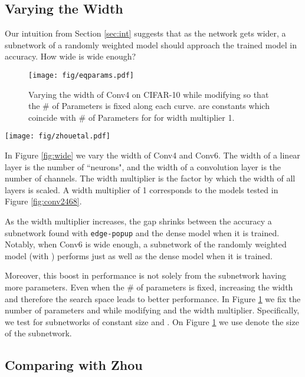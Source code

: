 \documentclass[10pt,twocolumn,letterpaper]{article}
\newcommand{\alg}{\texttt{edge-popup} }
\begin{document}
\subsection{Varying the Width}

Our intuition from Section \ref{sec:int} suggests that as the network gets wider, a subnetwork of a randomly weighted model should approach the trained model in accuracy. How wide is wide enough? 
\begin{figure}[h]
    \centering
    \texttt{[image: fig/eqparams.pdf]}
    \caption{Varying the width of Conv4  on CIFAR-10 \cite{cifar} while modifying  so that the \# of Parameters is fixed along each curve.  are constants which coincide with \# of Parameters for  for width multiplier 1.}
    \label{fig:eqparams}
\end{figure}

\begin{figure*}[t!]
    \centering
    \texttt{[image: fig/zhouetal.pdf]}
    \caption{Comparing the performance of \alg with the algorithm presented by Zhou \etal \cite{supermask} on CIFAR-10 \cite{cifar}.}
    \label{fig:zhou}
\end{figure*}

In Figure \ref{fig:wide} we vary the width of Conv4 and Conv6.  The width of a linear layer is the number of ``neurons", and the width of a convolution layer is the number of channels. The width multiplier is the factor by which the width of all layers is scaled. A width multiplier of 1 corresponds to the models tested in Figure \ref{fig:conv2468}.

As the width multiplier increases, the gap shrinks between the accuracy a subnetwork found with \alg and the dense model when it is trained. Notably, when Conv6 is wide enough, a subnetwork of the randomly weighted model (with ) performs just as well as the dense model when it is trained. 

Moreover, this boost in performance is not solely from the subnetwork having more parameters. Even when the \# of parameters is fixed, increasing the width and therefore the search space leads to better performance. In Figure \ref{fig:eqparams} we fix the number of parameters and while modifying  and the width multiplier. Specifically, we test  for subnetworks of constant size  and . On Figure \ref{fig:eqparams} we use  denote the size of the subnetwork.

\subsection{Comparing with Zhou \etal \cite{supermask}} \label{sec:baseline}
\end{document}
